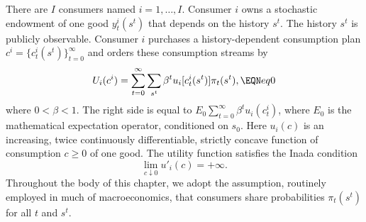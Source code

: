 There are $I$ consumers named $i=1, \ldots , I$. Consumer $i$
owns a stochastic endowment of one good
$y_t^i(s^t)$ that depends on the
history $s^t$.
The history $s^t$ is publicly observable.
Consumer $i$
purchases a history-dependent  consumption plan $c^i =
 \{c_t^i(s^t)\}_{t=0}^\infty$ and
orders these
consumption streams by
%
%
$$ U_i(c^i) =
   \sum_{t=0}^\infty \sum_{s^t} \beta^t u_i[c_t^i(s^t)]
   \pi_t(s^t),
 \EQN eq0 $$
 where $0 < \beta < 1$.
The right side is equal to $ E_0 \sum_{t=0}^\infty \beta^t
u_i(c_t^i) $, where $E_0$ is the mathematical expectation operator,
conditioned on $s_0$. Here $u_i(c)$ is an increasing, twice
continuously differentiable, strictly concave function of
consumption $c\geq 0$  of one good. The utility function satisfies
the Inada condition
$$ \lim_{c \downarrow 0} u'_i(c) = +\infty.$$
Throughout the body  of this chapter, we adopt the assumption, routinely
employed in much of macroeconomics,
that  consumers share   probabilities $\pi_t(s^t)$ for all $t$ and $s^t$.

